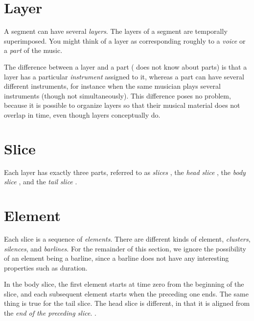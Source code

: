 \section{Layer}

A segment can have several \emph{layers}.  The layers of
a segment are temporally superimposed.  You might think of a layer as
corresponding roughly to a \emph{voice}  or a \emph{part}
 of the music.  

The difference between a layer and a part ({\gs} does not know about
parts) is that a layer has a particular \emph{instrument}
 assigned to it, whereas a part can have several
different instruments, for instance when the same musician plays
several instruments (though not simultaneously).  This difference poses
no problem, because it is possible to organize {\gs} layers so that
their musical material does not overlap in time, even though layers
conceptually do. 

\section{Slice}

Each layer has exactly three parts, referred to as \emph{slices}
, the \emph{head slice}
, the \emph{body slice}
, and the \emph{tail slice}
. 

\section{Element}

Each slice is a sequence of \emph{elements}.  There are
different kinds of element, \emph{clusters},
\emph{silences}, and \emph{barlines}.
For the remainder of this section, we ignore the possibility of
an element being a barline, since a barline does not have any
interesting properties such as duration.

In the body slice, the first element starts at time zero from the
beginning of the slice, and each subsequent element starts when the
preceding one ends.  The same thing is true for the tail
slice.  The head slice is
different, in that it is aligned from the \emph{end of the preceding
slice}.  .

